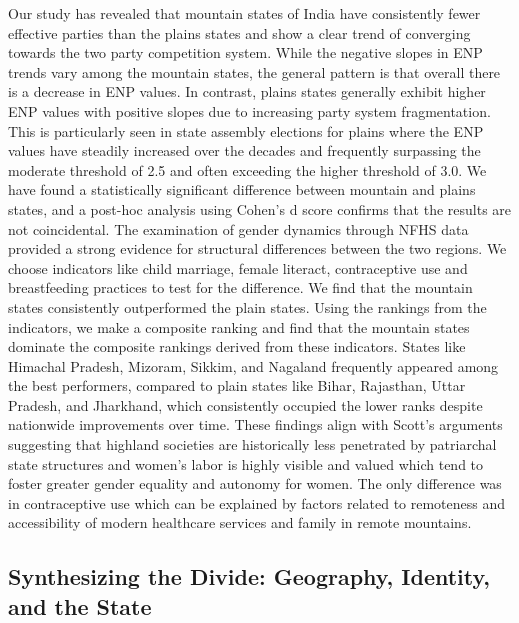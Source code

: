 Our study has revealed that mountain states of India have consistently fewer effective parties than the plains states and show a clear trend of converging towards the two party competition system. While the negative slopes in ENP trends vary among the mountain states, the general pattern is that overall there is a decrease in ENP values. In contrast, plains states generally exhibit higher ENP values with positive slopes due to increasing party system fragmentation. This is particularly seen in state assembly elections for plains where the ENP values have steadily increased over the decades and frequently surpassing the moderate threshold of 2.5 and often exceeding the higher threshold of 3.0. We have found a statistically significant difference between mountain and plains states, and a post-hoc analysis using Cohen’s d score confirms that the results are not coincidental. The examination of gender dynamics through NFHS data provided a strong evidence for structural differences between the two regions. We choose indicators like child marriage, female literact, contraceptive use and breastfeeding practices to test for the difference. We find that the mountain states consistently outperformed the plain states. Using the rankings from the indicators, we make a composite ranking and find that the mountain states dominate the composite rankings derived from these indicators. States like Himachal Pradesh, Mizoram, Sikkim, and Nagaland frequently appeared among the best performers, compared to plain states like Bihar, Rajasthan, Uttar Pradesh, and Jharkhand, which consistently occupied the lower ranks despite nationwide improvements over time. These findings align with Scott's arguments suggesting that highland societies are historically less penetrated by patriarchal state structures and women's labor is highly visible and valued which tend to foster greater gender equality and autonomy for women. The only difference was in contraceptive use which can be explained by factors related to remoteness and accessibility of modern healthcare services and family in remote mountains. 

\subsection{Synthesizing the Divide: Geography, Identity, and the State
}

